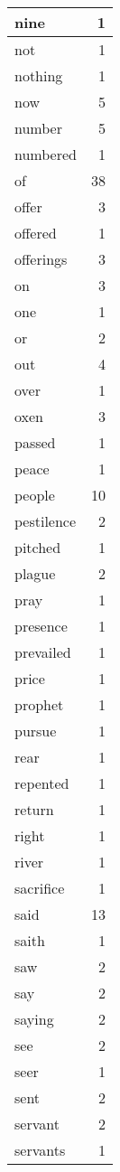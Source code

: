 \begin{center}
\begin{longtable}{l|r}
nine & 1 \\ \hline
not & 1 \\ \hline
nothing & 1 \\ \hline
now & 5 \\ \hline
number & 5 \\ \hline
numbered & 1 \\ \hline
of & 38 \\ \hline
offer & 3 \\ \hline
offered & 1 \\ \hline
offerings & 3 \\ \hline
on & 3 \\ \hline
one & 1 \\ \hline
or & 2 \\ \hline
out & 4 \\ \hline
over & 1 \\ \hline
oxen & 3 \\ \hline
passed & 1 \\ \hline
peace & 1 \\ \hline
people & 10 \\ \hline
pestilence & 2 \\ \hline
pitched & 1 \\ \hline
plague & 2 \\ \hline
pray & 1 \\ \hline
presence & 1 \\ \hline
prevailed & 1 \\ \hline
price & 1 \\ \hline
prophet & 1 \\ \hline
pursue & 1 \\ \hline
rear & 1 \\ \hline
repented & 1 \\ \hline
return & 1 \\ \hline
right & 1 \\ \hline
river & 1 \\ \hline
sacrifice & 1 \\ \hline
said & 13 \\ \hline
saith & 1 \\ \hline
saw & 2 \\ \hline
say & 2 \\ \hline
saying & 2 \\ \hline
see & 2 \\ \hline
seer & 1 \\ \hline
sent & 2 \\ \hline
servant & 2 \\ \hline
servants & 1 \\ \hline

\end{longtable}
\end{center}
